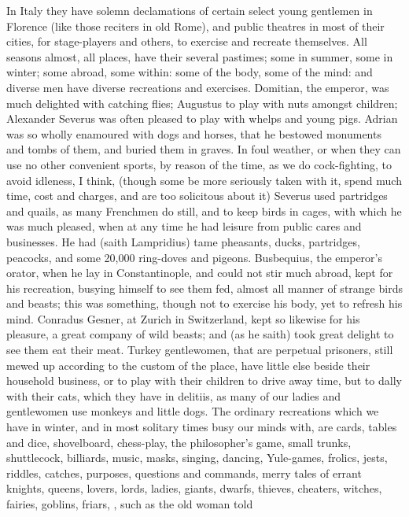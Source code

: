{In Italy they have solemn declamations of certain select young
gentlemen in Florence (like those reciters in old Rome), and public
theatres in most of their cities, for stage-players and others, to
exercise and recreate themselves. All seasons almost, all places, have
their several pastimes; some in summer, some in winter; some abroad,
some within: some of the body, some of the mind: and diverse men have
diverse recreations and exercises. Domitian, the emperor, was much
delighted with catching flies; Augustus to play with nuts amongst
children; Alexander Severus was often pleased to play with whelps
and young pigs. Adrian was so wholly enamoured with dogs and
horses, that he bestowed monuments and tombs of them, and buried them
in graves. In foul weather, or when they can use no other convenient
sports, by reason of the time, as we do cock-fighting, to avoid
idleness, I think, (though some be more seriously taken with it, spend
much time, cost and charges, and are too solicitous about it)
Severus used partridges and quails, as many Frenchmen do still,
and to keep birds in cages, with which he was much pleased, when at any
time he had leisure from public cares and businesses. He had (saith
Lampridius) tame pheasants, ducks, partridges, peacocks, and some
20,000 ring-doves and pigeons. Busbequius, the emperor's orator, when
he lay in Constantinople, and could not stir much abroad, kept for his
recreation, busying himself to see them fed, almost all manner of
strange birds and beasts; this was something, though not to exercise
his body, yet to refresh his mind. Conradus Gesner, at Zurich in
Switzerland, kept so likewise for his pleasure, a great company of wild
beasts; and (as he saith) took great delight to see them eat their
meat. Turkey gentlewomen, that are perpetual prisoners, still mewed up
according to the custom of the place, have little else beside their
household business, or to play with their children to drive away time,
but to dally with their cats, which they have in delitiis, as many of
our ladies and gentlewomen use monkeys and little dogs. The ordinary
recreations which we have in winter, and in most solitary times busy
our minds with, are cards, tables and dice, shovelboard, chess-play,
the philosopher's game, small trunks, shuttlecock, billiards, music,
masks, singing, dancing, Yule-games, frolics, jests, riddles, catches,
purposes, questions and commands, merry tales of errant knights,
queens, lovers, lords, ladies, giants, dwarfs, thieves, cheaters,
witches, fairies, goblins, friars, \etc{}, such as the old woman told
}
